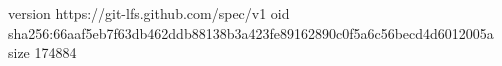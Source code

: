version https://git-lfs.github.com/spec/v1
oid sha256:66aaf5eb7f63db462ddb88138b3a423fe89162890c0f5a6c56becd4d6012005a
size 174884
